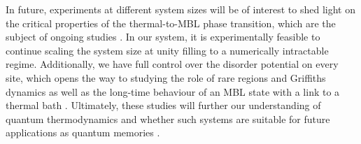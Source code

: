 In future, experiments at different system sizes will be of interest to shed light on the critical properties of the thermal-to-MBL phase transition, which are the subject of ongoing studies \cite{Vosk2015, Potter2015, Khemani2017, Lueschen2017a}. In our system, it is experimentally feasible to continue scaling the system size at unity filling to a numerically intractable regime. Additionally, we have full control over the disorder potential on every site, which opens the way to studying the role of rare regions and Griffiths dynamics as well as the long-time behaviour of an MBL state with a link to a thermal bath \cite{Agarwal2017, Roeck2017, Nandkishore2017}. Ultimately, these studies will further our understanding of quantum thermodynamics and whether such systems are suitable for future applications as quantum memories \cite{Nandkishore2015, Banuls2017}.

